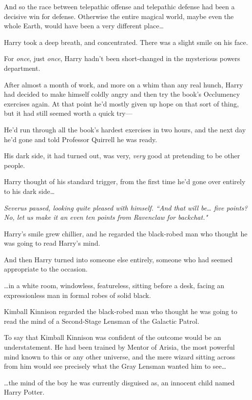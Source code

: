And so the race between telepathic offense and telepathic defense had been a decisive win for defense. Otherwise the entire magical world, maybe even the whole Earth, would have been a very different place{\ldots}

Harry took a deep breath, and concentrated. There was a slight smile on his face.

For \emph{once}, just \emph{once}, Harry hadn't been short-changed in the mysterious powers department.

After almost a month of work, and more on a whim than any real hunch, Harry had decided to make himself coldly angry and then try the book's Occlumency exercises again. At that point he'd mostly given up hope on that sort of thing, but it had still seemed worth a quick try---

He'd run through all the book's hardest exercises in two hours, and the next day he'd gone and told Professor Quirrell he was ready.

His dark side, it had turned out, was very, \emph{very} good at pretending to be other people.

Harry thought of his standard trigger, from the first time he'd gone over entirely to his dark side{\ldots}

\emph{Severus paused, looking quite pleased with himself. ``And that will be{\ldots} five points? No, let us make it an even ten points from Ravenclaw for backchat."}

Harry's smile grew chillier, and he regarded the black-robed man who thought he was going to read Harry's mind.

And then Harry turned into someone else entirely, someone who had seemed appropriate to the occasion.

{\ldots}in a white room, windowless, featureless, sitting before a desk, facing an expressionless man in formal robes of solid black.

Kimball Kinnison regarded the black-robed man who thought he was going to read the mind of a Second-Stage Lensman of the Galactic Patrol.

To say that Kimball Kinnison was confident of the outcome would be an understatement. He had been trained by Mentor of Arisia, the most powerful mind known to this or any other universe, and the mere wizard sitting across from him would see precisely what the Gray Lensman wanted him to see{\ldots}

{\ldots}the mind of the boy he was currently disguised as, an innocent child named Harry Potter.


